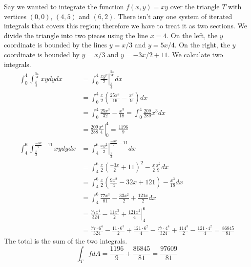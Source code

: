 \documentclass[fleqn,letterpaper]{report}
\begin{document}
\begin{example}
Say we wanted to integrate the function $f(x,y) = xy$ over the
triangle $T$ with vertices $(0,0)$, $(4,5)$ and $(6,2)$.
There isn't any one system of iterated integrals that covers
this region; therefore we have to treat it as two sections.
We divide the triangle into two pieces using the line $x=4$.
On the left, the $y$ coordinate is bounded by the lines
$y=x/3$ and $y=5x/4$. On the right, the $y$ coordinate is
bounded by $y=x/3$ and $y=-3x/2 + 11$. We calculate two
integrals.
\begin{align*}
\int_0^4 \int_{\frac{x}{3}}^{\frac{5x}{4}} xy dy dx & =
\int_0^4 \left. \frac{xy^2}{2}
\right|_{\frac{x}{3}}^{\frac{5x}{4}} dx \\
& = \int_0^4 \frac{x}{2} \left( \frac{25x^2}{16} -
\frac{x^2}{9} \right) dx \\
& = \int_0^4 \frac{25x^3}{32} - \frac{x^3}{18} = \int_0^4
\frac{209}{289} x^3 dx \\
& = \left. \frac{209}{288} \frac{x^4}{4} \right|_0^4 =
\frac{1196}{9} \\
\int_4^6 \int_{\frac{x}{3}}^{\frac{-3x}{2} - 11} xy dy dx & =
\int_4^6 \left. \frac{xy^2}{2}
\right|_{\frac{x}{3}}^{\frac{-3x}{2} - 11} dx \\
& = \int_4^6 \frac{x}{2} \left( \frac{-3x}{2} + 11 \right)^2 -
\frac{x}{2} \frac{x^2}{9} dx \\
& = \int_4^6 \frac{x}{2} \left( \frac{9x^2}{4} - 32 x + 121
\right) - \frac{x^3}{18} dx \\
& = \int_4^6 \frac{77x^3}{81} - \frac{33x^2}{2} + \frac{121
x}{2} dx \\
& = \left. \frac{77x^4}{324} - \frac{11x^3}{2} + \frac{121
x^2}{4} \right|_4^6 \\
& = \frac{77 \cdot 6^4}{324} - \frac{11 \cdot 6^3}{2} +
\frac{121 \cdot 6^2}{4} - \frac{77\cdot 4^4}{324} + \frac{11
4^3}{2} - \frac{121 \cdot 4^2}{4} = \frac{86845}{81}
\end{align*}
The total is the sum of the two integrals.
\begin{equation*}
\int_T f dA = \frac{1196}{9} + \frac{86845}{81} = \frac{97609}{81}
\end{equation*}
\end{example}
\end{document}
